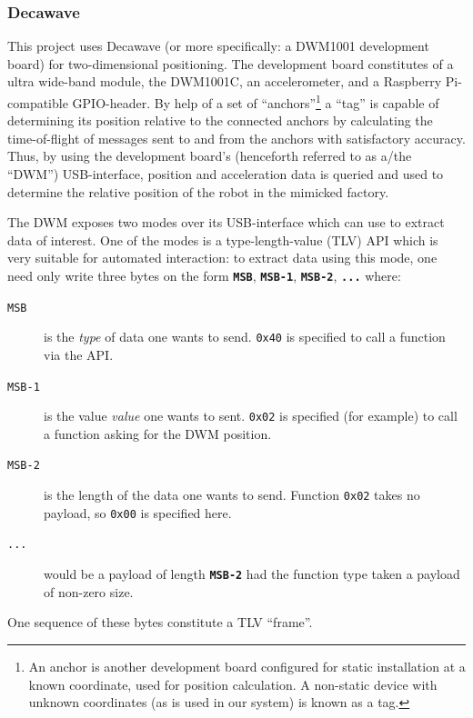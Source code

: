 \subsubsection{Decawave}
This project uses Decawave (or more specifically: a DWM1001 development board) for two-dimensional positioning.
The development board constitutes of a ultra wide-band module, the DWM1001C, an accelerometer,
and a Raspberry Pi-compatible GPIO-header.
By help of a set of ``anchors''\footnote{An anchor is another development board configured for static installation at a known coordinate, used for position calculation. A non-static device with unknown coordinates (as is used in our system) is known as a tag.} a ``tag'' is capable of determining its position relative to the connected anchors by calculating the time-of-flight of messages sent to and from the anchors with satisfactory accuracy.
Thus, by using the development board's (henceforth referred to as a/the ``DWM'') USB-interface,
position and acceleration data is queried and used to determine the relative position of the robot in the mimicked factory.

The DWM  exposes two modes over its USB-interface which can use to extract data of interest.
One of the modes is a type-length-value (TLV) API which is very suitable for automated interaction:
to extract data using this mode, one need only write three bytes on the form \texttt{\textbf{MSB}}, \texttt{\textbf{MSB-1}}, \texttt{\textbf{MSB-2}}, \texttt{\textbf{...}} where:
\begin{description}
\item[\texttt{MSB}] is the \textit{type} of data one wants to send. \texttt{0x40} is specified to call a function via the API.
\item[\texttt{MSB-1}] is the value \textit{value} one wants to sent. \texttt{0x02} is specified (for example) to call a function asking for the DWM position.
\item[\texttt{MSB-2}] is the length of the data one wants to send. Function \texttt{0x02} takes no payload, so \texttt{0x00} is specified here.
\item[\texttt{...}] would be a payload of length \texttt{\textbf{MSB-2}} had the function type taken a payload of non-zero size.
\end{description}
One sequence of these bytes constitute a TLV ``frame''.

